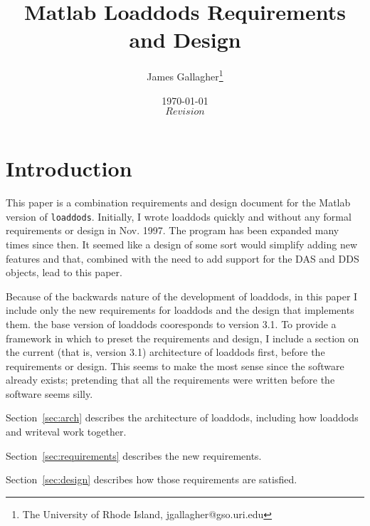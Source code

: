 \documentclass{article}
\begin{document}
\title{Matlab Loaddods Requirements and Design}
\author{James Gallagher\thanks{The University of Rhode Island,
    jgallagher@gso.uri.edu}}
\date{\today \\ $Revision$ }

\maketitle
\tableofcontents

\section{Introduction}

This paper is a combination requirements and design document for the Matlab
version of \texttt{loaddods}. Initially, I wrote loaddods quickly and without
any formal requirements or design in Nov. 1997. The program has been expanded
many times since then. It seemed like a design of some sort would simplify
adding new features and that, combined with the need to add support for the
DAS and DDS objects, lead to this paper.

Because of the backwards nature of the development of loaddods, in this paper
I include only the new requirements for loaddods and the design that
implements them. the base version of loaddods cooresponds to version 3.1. To
provide a framework in which to preset the requirements and design, I include
a section on the current (that is, version 3.1) architecture of loaddods
first, before the requirements or design. This seems to make the most sense
since the software already exists; pretending that all the requirements were
written before the software seems silly.

Section~\ref{sec:arch} describes the architecture of loaddods, including how
loaddods and writeval work together.

Section~\ref{sec:requirements} describes the new requirements.

Section~\ref{sec:design} describes how those requirements are satisfied.
\end{document}
